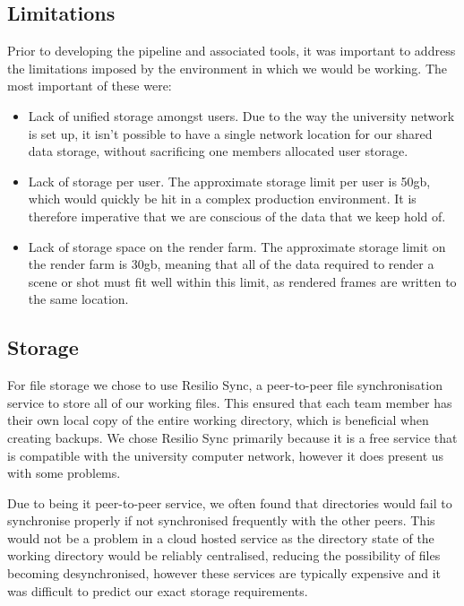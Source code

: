 \documentclass[11pt]{article}
\begin{document}
\subsection{Limitations}

Prior to developing the pipeline and associated tools, it was important to address the limitations imposed by the environment in which we would be working. The most important of these were:

\begin{itemize}

\item Lack of unified storage amongst users. Due to the way the university network is set up, it isn't possible to have a single network location for our shared data storage, without sacrificing one members allocated user storage.

\item Lack of storage per user. The approximate storage limit per user is 50gb, which would quickly be hit in a complex production environment. It is therefore imperative that we are conscious of the data that we keep hold of.

\item Lack of storage space on the render farm. The approximate storage limit on the render farm is 30gb, meaning that all of the data required to render a scene or shot must fit well within this limit, as rendered frames are written to the same location.

\end{itemize}

\subsection{Storage}

For file storage we chose to use Resilio Sync, a peer-to-peer file synchronisation service
to store all of our working files. This ensured that each team member has their own local copy of the entire working directory, which is beneficial when creating backups. We chose Resilio Sync primarily because it is a free service that is compatible with the university computer network, however it does present us with some problems.

Due to being it peer-to-peer service, we often found that directories would fail to synchronise properly if not synchronised frequently with the other peers. This would not be a problem in a cloud hosted service as the directory state of the working directory would be reliably centralised, reducing the possibility of files becoming desynchronised, however these services are typically expensive and it was difficult to predict our exact storage requirements.
\end{document}

